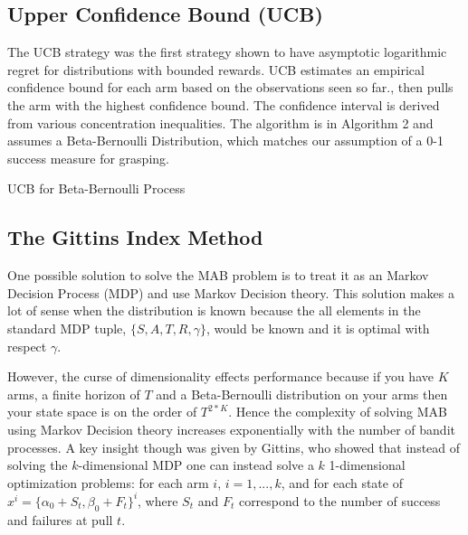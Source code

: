 \documentclass[letterpaper, 10 pt, conference]{ieeeconf}  %
\begin{document}
\subsection{Upper Confidence Bound (UCB)}
The UCB strategy was the first strategy shown to have asymptotic logarithmic regret \cite{lai1985asymptotically} for distributions with bounded rewards. UCB estimates an empirical confidence bound for each arm based on the observations seen so far., then pulls the arm with the highest confidence bound. The confidence interval is derived from various concentration inequalities. The algorithm is in Algorithm 2 and assumes a Beta-Bernoulli Distribution, which matches our assumption of a 0-1 success measure for grasping. 

\begin{algorithm}
 \caption{UCB for Beta-Bernoulli Process}
\end{algorithm}

\subsection{The Gittins Index Method} 
One possible solution to solve the MAB problem is to treat it as an Markov Decision Process (MDP) and use Markov Decision theory. This solution makes a lot of sense when the distribution is known because the all elements in the standard MDP tuple, $\lbrace S,A,T,R,\gamma \rbrace$, would be known and it is optimal with respect $\gamma$. 

However, the curse of dimensionality effects performance because if you have $K$ arms, a finite horizon of $T$ and a Beta-Bernoulli distribution on your arms then your state space is on the order of $T^{2*K}$. Hence the complexity of solving MAB using Markov Decision theory increases exponentially with the number of bandit processes. A key insight though was given by Gittins, who showed that instead of solving the $k$-dimensional MDP one can instead solve a $k$ 1-dimensional optimization problems: for each arm $i$, $i= 1,...,k$, and for each state of $x^i = \lbrace \alpha_0 +S_t, \beta_0 +F_t \rbrace^i$, where $S_t$ and $F_t$ correspond to the number of success and failures at pull $t$. 
\end{document}
